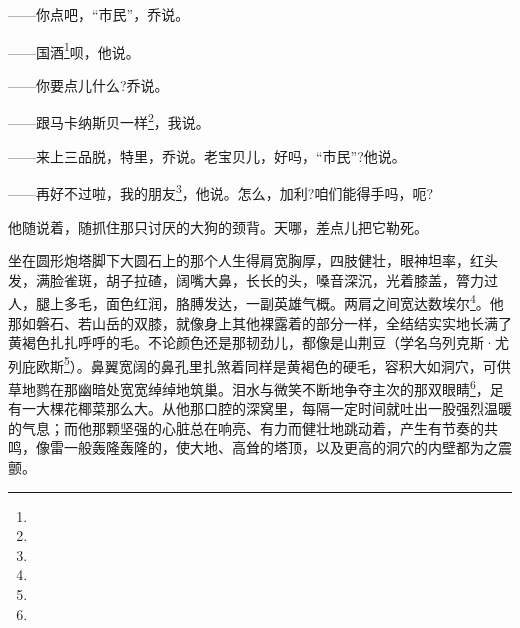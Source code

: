 \par ——你点吧，“市民”，乔说。
\par ——国酒\footnote{}呗，他说。
\par ——你要点儿什么?乔说。
\par ——跟马卡纳斯贝一样\footnote{}，我说。
\par ——来上三品脱，特里，乔说。老宝贝儿，好吗，“市民”?他说。
\par ——再好不过啦，我的朋友\footnote{}，他说。怎么，加利?咱们能得手吗，呃?
\par 他随说着，随抓住那只讨厌的大狗的颈背。天哪，差点儿把它勒死。
\par 坐在圆形炮塔脚下大圆石上的那个人生得肩宽胸厚，四肢健壮，眼神坦率，红头发，满脸雀斑，胡子拉碴，阔嘴大鼻，长长的头，嗓音深沉，光着膝盖，膂力过人，腿上多毛，面色红润，胳膊发达，一副英雄气概。两肩之间宽达数埃尔\footnote{}。他那如磐石、若山岳的双膝，就像身上其他裸露着的部分一样，全结结实实地长满了黄褐色扎扎呼呼的毛。不论颜色还是那韧劲儿，都像是山荆豆（学名乌列克斯·尤列庇欧斯\footnote{}）。鼻翼宽阔的鼻孔里扎煞着同样是黄褐色的硬毛，容积大如洞穴，可供草地鹨在那幽暗处宽宽绰绰地筑巢。泪水与微笑不断地争夺主次的那双眼睛\footnote{}，足有一大棵花椰菜那么大。从他那口腔的深窝里，每隔一定时间就吐出一股强烈温暖的气息；而他那颗坚强的心脏总在响亮、有力而健壮地跳动着，产生有节奏的共鸣，像雷一般轰隆轰隆的，使大地、高耸的塔顶，以及更高的洞穴的内壁都为之震颤。
